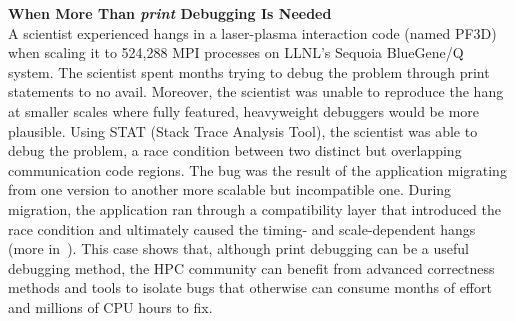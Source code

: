 \begin{WrapTextLeft}
\footnotesize
{\large \textbf{When More Than \textit{print} Debugging Is Needed}}\\
A scientist experienced hangs in a laser-plasma interaction code 
(named PF3D) when scaling it to 524,288 MPI processes on 
LLNL’s Sequoia BlueGene/Q system. The scientist spent months trying 
to debug the problem through print statements to no avail. 
Moreover, the scientist was unable to reproduce the hang at 
smaller scales where fully featured, heavyweight debuggers 
would be more plausible. Using STAT (Stack Trace Analysis Tool), 
the scientist was able to debug the problem, a race condition 
between two distinct but overlapping communication code regions. 
The bug was the result of the application migrating from one version to another more scalable but incompatible one. During migration, the application ran 
through a compatibility layer that introduced the race condition 
and ultimately caused the timing- and scale-dependent hangs 
(more in~\cite{CACM:Debugging}). This case shows that, although 
print debugging can be a useful debugging method, 
the HPC community can benefit from advanced correctness 
methods and tools to isolate bugs that otherwise can consume 
months of effort and millions of CPU hours to fix.

\end{WrapTextLeft}